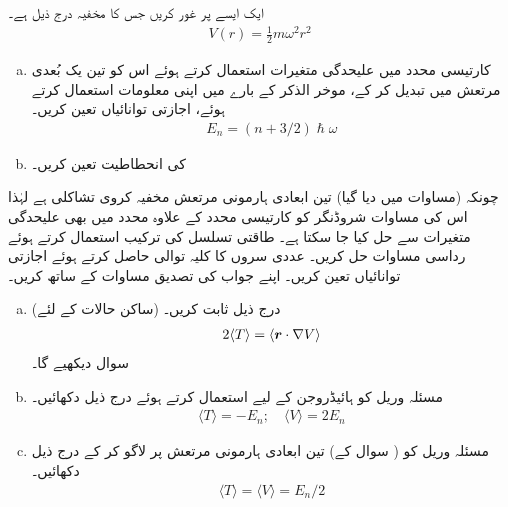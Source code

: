 ایک ایسے  پر غور کریں جس کا مخفیہ درج ذیل ہے۔ 
\begin{align}\label{مساوات_تین_ابعادی_ہارمونی_مخفیہ}
V(r) = \frac{1}{2} m \omega^2 r^2
\end{align}
\begin{enumerate}[a.]
\item
کارتیسی محدد میں علیحدگی متغیرات استعمال کرتے ہوئے اس کو تین یک بُعدی مرتعش میں تبدیل کر کے، موخر الذکر کے بارے میں اپنی معلومات استعمال کرتے ہوئے، اجازتی توانائیاں تعین کریں۔  
\begin{align}\label{مساوات_تین_ابعادی_ہارمونی_اجازتی}
E_n = (n + 3/2) \hslash \omega
\end{align}
\item
{} کی انحطاطیت  تعین کریں۔
\end{enumerate}
چونکہ (مساوات  میں دیا گیا) تین ابعادی ہارمونی مرتعش مخفیہ کروی تشاکلی ہے لہٰذا اس کی مساوات شروڈنگر کو کارتیسی محدد کے علاوہ  محدد میں بھی علیحدگی متغیرات سے حل کیا جا سکتا ہے۔ طاقتی تسلسل کی ترکیب استعمال کرتے ہوئے رداسی مساوات حل کریں۔ عددی سروں کا کلیہ توالی حاصل کرتے ہوئے اجازتی توانائیاں تعین کریں۔ اپنے جواب کی تصدیق مساوات  کے ساتھ کریں۔
\begin{enumerate}[a.]
\item
(ساکن حالات کے لئے) درج ذیل  ثابت کریں۔
\begin{align}
2 \langle T \rangle = \langle {\ensuremath{{\boldsymbol{r}}}} \cdot \nabla V \rangle
\end{align}
 سوال  دیکھیے گا۔ 
\item
مسئلہ وریل کو ہائیڈروجن کے لیے استعمال کرتے ہوئے درج ذیل دکھائیں۔ 
\begin{align}\label{مساوات_تین_ابعادی_مسئلہ_وریل}
\langle T \rangle = - E_n; \quad \langle V \rangle = 2 E_n
\end{align}
\item
مسئلہ وریل کو ( سوال  کے) تین ابعادی ہارمونی مرتعش پر لاگو کر کے درج ذیل دکھائیں۔ 
\begin{align}
\langle T \rangle = \langle V \rangle = E_n /2
\end{align}
\end{enumerate}
